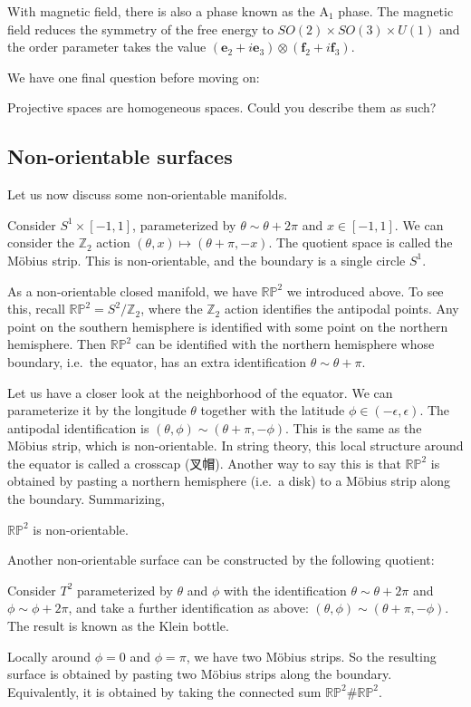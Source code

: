 \documentclass[12pt]{article}
\numberwithin{equation}{section}
\numberwithin{figure}{section}
\theoremstyle{remark}
\def\bZ{\mathbb{Z}}
\def\RP{\mathbb{RP}}
\begin{document}
With magnetic field, there is also a phase known as the A$_1$ phase.
The magnetic field reduces the symmetry of the free energy
to $SO(2)\times SO(3)\times U(1)$
and the order parameter takes the value 
 $(\mathbf{e}_2+i\mathbf{e}_3) \otimes (\mathbf{f}_2+ i\mathbf{f}_3)$.

We have one final question before moving on:
\begin{question}
Projective spaces are homogeneous spaces. Could you describe them as such?
\end{question}


\subsection{Non-orientable surfaces}

Let us now discuss some non-orientable manifolds.

\begin{example}
  Consider $S^1\times [-1,1]$, parameterized by $\theta\sim \theta+2\pi$ and $x\in [-1,1]$.
  We can consider the $\bZ_2$ action $(\theta,x)\mapsto (\theta+\pi,-x)$.
  The quotient space is called the M\"obius strip.
  This is non-orientable, and the boundary is a single circle $S^1$.
\end{example}

As a non-orientable closed manifold, 
we have $\RP^2$ we introduced above. To see this, recall $\RP^2=S^2/\bZ_2$,
where the $\bZ_2$ action identifies the antipodal points. 
Any point on the southern hemisphere is identified with some point on the northern hemisphere.
Then $\RP^2$ can be identified with the northern hemisphere
whose boundary, i.e.~the equator, has an extra identification $\theta \sim \theta+\pi$.

Let us have a closer look at the neighborhood of the equator.
We can parameterize it by the longitude $\theta$ together with the latitude $\phi\in (-\epsilon,\epsilon)$.
The antipodal identification is $(\theta,\phi)\sim (\theta+\pi,-\phi)$.
This is the same as the M\"obius strip, which is non-orientable.
In string theory, this local structure around the equator is called a crosscap (叉帽).
Another way to say this is that $\RP^2$ is obtained by pasting a northern hemisphere (i.e.~a disk)
to a M\"obius strip along the boundary.
Summarizing,
\begin{proposition}
$\RP^2$ is non-orientable.
\end{proposition}

Another non-orientable surface can be constructed by the following quotient:
\begin{example}
Consider $T^2$ parameterized by $\theta$ and $\phi$
with the identification $\theta\sim \theta+2\pi$ and $\phi \sim \phi+2\pi$,
and take a further identification as above: $(\theta,\phi)\sim (\theta+\pi,-\phi)$.
The result is known as the Klein bottle.
\end{example}
Locally around $\phi=0$ and $\phi=\pi$, we have two M\"obius strips.
So the resulting surface is obtained by pasting two M\"obius strips along the boundary.
Equivalently, it is obtained by taking the connected sum $\RP^2\#\RP^2$.
\end{document}
